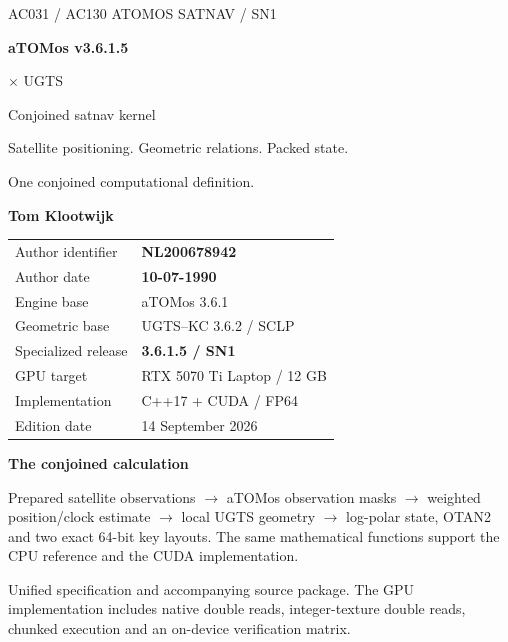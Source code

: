 \documentclass[11pt,a4paper]{article}
\begin{document}
\begin{titlepage}
\thispagestyle{empty}
{\sffamily\color{teal}\large AC031 / AC130 ATOMOS \hfill SATNAV / SN1}\par
\vspace{19mm}
{\sffamily\bfseries\fontsize{54}{60}\selectfont\color{ink}aTOMos v3.6.1.5}\par
\vspace{6mm}
{\sffamily\fontsize{34}{40}\selectfont\color{gold}$\times$ UGTS}\par
\vspace{9mm}
{\sffamily\fontsize{27}{33}\selectfont Conjoined satnav kernel}\par
\vspace{8mm}
{\large Satellite positioning. Geometric relations. Packed state.\par
One conjoined computational definition.}\par
\vspace{17mm}
{\sffamily\bfseries\Large Tom Klootwijk}\par
\begin{tabular}{@{}ll@{}}
Author identifier & \textbf{NL200678942}\\
Author date & \textbf{10-07-1990}\\
Engine base & aTOMos 3.6.1\\
Geometric base & UGTS--KC 3.6.2 / SCLP\\
Specialized release & \textbf{3.6.1.5 / SN1}\\
GPU target & RTX 5070 Ti Laptop / 12 GB\\
Implementation & C++17 + CUDA / FP64\\
Edition date & 14 September 2026\\
\end{tabular}
\vfill
\begin{panel}
\textbf{The conjoined calculation}\par
Prepared satellite observations $\to$ aTOMos observation masks $\to$ weighted position/clock estimate
$\to$ local UGTS geometry $\to$ log-polar state, OTAN2 and two exact 64-bit key layouts.
The same mathematical functions support the CPU reference and the CUDA implementation.
\end{panel}
{\small\color{muted}Unified specification and accompanying source package. The GPU implementation includes
native double reads, integer-texture double reads, chunked execution and an on-device verification matrix.}
\end{titlepage}
\setcounter{page}{2}
\end{document}
